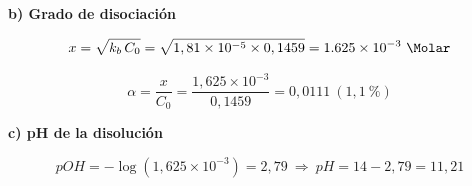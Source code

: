 \begin{exerciseEVAU}
\begin{solu}
        \textbf{b) Grado de disociación}

        \begin{equation*}
            x = \sqrt{k_b\, C_0} = \sqrt{1,81\times10^{-5}\times0,1459} = \num{1.625e-3} \ \si{\Molar}
        \end{equation*}

        \begin{equation*}
            \alpha = \dfrac{x}{C_0} = \dfrac{1,625\times10^{-3}}{0,1459} = 0,0111 \ (1,1\ \%)
        \end{equation*}

        \textbf{c) pH de la disolución}

        \begin{equation*}
            pOH = -\log(1,625\times10^{-3}) = 2,79 \ \Rightarrow \ pH = 14-2,79 = 11,21
        \end{equation*}

    \end{solu}
\end{exerciseEVAU}

